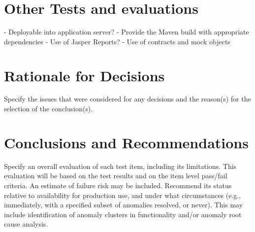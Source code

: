 \section{Other Tests and evaluations}
- Deployable into application server?
- Provide the Maven build with appropriate dependencies
- Use of Jasper Reports?
- Use of contracts and mock objects

\section{Rationale for Decisions}
Specify the issues that were considered for any decisions and the reason(s) for the selection of the
conclusion(s).

\section{Conclusions and Recommendations}
Specify an overall evaluation of each test item, including its limitations. This evaluation will be based
on the test results and on the item level pass/fail criteria. An estimate of failure risk may be included.
Recommend its status relative to availability for production use, and under what circumstances (e.g.,
immediately, with a specified subset of anomalies resolved, or never). This may include identification
of anomaly clusters in functionality and/or anomaly root cause analysis.
